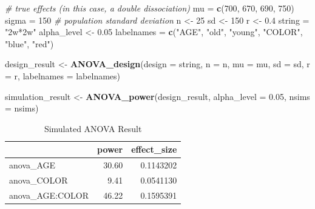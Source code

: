 \documentclass[]{book}
\newenvironment{Shaded}{\begin{snugshade}}{\end{snugshade}}
\newcommand{\CommentTok}[1]{\textcolor[rgb]{0.56,0.35,0.01}{\textit{#1}}}
\newcommand{\DataTypeTok}[1]{\textcolor[rgb]{0.13,0.29,0.53}{#1}}
\newcommand{\DecValTok}[1]{\textcolor[rgb]{0.00,0.00,0.81}{#1}}
\newcommand{\FloatTok}[1]{\textcolor[rgb]{0.00,0.00,0.81}{#1}}
\newcommand{\KeywordTok}[1]{\textcolor[rgb]{0.13,0.29,0.53}{\textbf{#1}}}
\newcommand{\NormalTok}[1]{#1}
\newcommand{\StringTok}[1]{\textcolor[rgb]{0.31,0.60,0.02}{#1}}
\begin{document}
\begin{Shaded}
\begin{Highlighting}[]
\CommentTok{# true effects (in this case, a double dissociation)}
\NormalTok{mu =}\StringTok{ }\KeywordTok{c}\NormalTok{(}\DecValTok{700}\NormalTok{, }\DecValTok{670}\NormalTok{, }\DecValTok{690}\NormalTok{, }\DecValTok{750}\NormalTok{) }
\NormalTok{sigma =}\StringTok{ }\DecValTok{150}  \CommentTok{# population standard deviation}
\NormalTok{n <-}\StringTok{ }\DecValTok{25}
\NormalTok{sd <-}\StringTok{ }\DecValTok{150}
\NormalTok{r <-}\StringTok{ }\FloatTok{0.4}
\NormalTok{string =}\StringTok{ "2w*2w"}
\NormalTok{alpha_level <-}\StringTok{ }\FloatTok{0.05}
\NormalTok{labelnames =}\StringTok{ }\KeywordTok{c}\NormalTok{(}\StringTok{"AGE"}\NormalTok{, }\StringTok{"old"}\NormalTok{, }\StringTok{"young"}\NormalTok{, }
               \StringTok{"COLOR"}\NormalTok{, }\StringTok{"blue"}\NormalTok{, }\StringTok{"red"}\NormalTok{)}

\NormalTok{design_result <-}\StringTok{ }\KeywordTok{ANOVA_design}\NormalTok{(}\DataTypeTok{design =}\NormalTok{ string,}
                              \DataTypeTok{n =}\NormalTok{ n, }
                              \DataTypeTok{mu =}\NormalTok{ mu, }
                              \DataTypeTok{sd =}\NormalTok{ sd, }
                              \DataTypeTok{r =}\NormalTok{ r, }
                              \DataTypeTok{labelnames =}\NormalTok{ labelnames)}
\end{Highlighting}
\end{Shaded}

\begin{Shaded}
\begin{Highlighting}[]
\NormalTok{simulation_result <-}\StringTok{ }\KeywordTok{ANOVA_power}\NormalTok{(design_result, }
                                 \DataTypeTok{alpha_level =} \FloatTok{0.05}\NormalTok{, }
                                 \DataTypeTok{nsims =}\NormalTok{ nsims)}
\end{Highlighting}
\end{Shaded}

\begin{table}[!h]

\caption{\label{tab:unnamed-chunk-154}Simulated ANOVA Result}
\centering
\begin{tabular}{l|r|r}
\hline
  & power & effect\_size\\
\hline
anova\_AGE & 30.60 & 0.1143202\\
\hline
anova\_COLOR & 9.41 & 0.0541130\\
\hline
anova\_AGE:COLOR & 46.22 & 0.1595391\\
\hline
\end{tabular}
\end{table}
\end{document}
